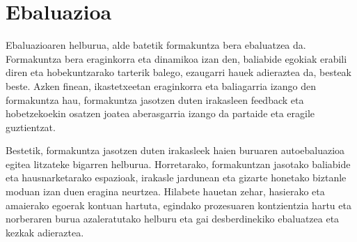 
\section{Ebaluazioa}
Ebaluazioaren helburua, alde batetik formakuntza bera ebaluatzea da. Formakuntza bera eraginkorra eta dinamikoa izan den, baliabide egokiak erabili diren eta hobekuntzarako tarterik balego, ezaugarri hauek adieraztea da, besteak beste. Azken finean, ikastetxeetan eraginkorra eta baliagarria izango den formakuntza hau, formakuntza jasotzen duten irakasleen feedback eta hobetzekoekin osatzen joatea aberasgarria izango da partaide eta eragile guztientzat. 

Bestetik, formakuntza jasotzen duten irakasleek haien buruaren autoebaluazioa egitea litzateke bigarren helburua. Horretarako, formakuntzan jasotako baliabide eta hausnarketarako espazioak, irakasle jardunean eta gizarte honetako biztanle moduan izan duen eragina neurtzea. Hilabete hauetan zehar, hasierako eta amaierako egoerak kontuan hartuta, egindako prozesuaren kontzientzia hartu eta norberaren burua azaleratutako helburu eta gai desberdinekiko ebaluatzea eta kezkak adieraztea. 
